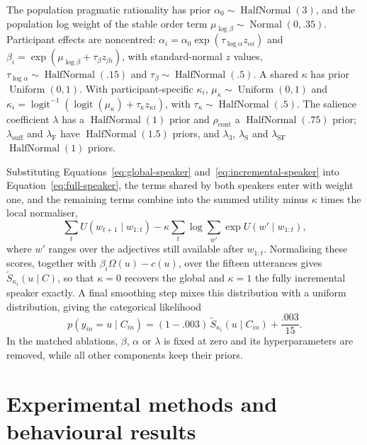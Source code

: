 \documentclass[10pt,a4paper,fleqn]{article}
\begin{document}
The population pragmatic rationality has prior $\alpha_0\sim\operatorname{HalfNormal}(3)$, and the population log weight of the stable order term $\mu_{\log\beta}\sim\operatorname{Normal}(0,.35)$.
Participant effects are noncentred: $\alpha_i=\alpha_0\exp(\tau_{\log\alpha}z_{\alpha i})$ and $\beta_i=\exp(\mu_{\log\beta}+\tau_\beta z_{\beta i})$, with standard-normal $z$ values, $\tau_{\log\alpha}\sim\operatorname{HalfNormal}(.15)$ and $\tau_\beta\sim\operatorname{HalfNormal}(.5)$.
A shared $\kappa$ has prior $\operatorname{Uniform}(0,1)$.
With participant-specific $\kappa_i$, $\mu_\kappa\sim\operatorname{Uniform}(0,1)$ and $\kappa_i=\operatorname{logit}^{-1}(\operatorname{logit}(\mu_\kappa)+\tau_\kappa z_{\kappa i})$, with $\tau_\kappa\sim\operatorname{HalfNormal}(.5)$.
The salience coefficient $\lambda$ has a $\operatorname{HalfNormal}(1)$ prior and $\rho_{\mathrm{cont}}$ a $\operatorname{HalfNormal}(.75)$ prior; $\lambda_{\mathrm{suff}}$ and $\lambda_{\mathrm F}$ have $\operatorname{HalfNormal}(1.5)$ priors, and $\lambda_3$, $\lambda_{\mathrm S}$ and $\lambda_{\mathrm{SF}}$ $\operatorname{HalfNormal}(1)$ priors.

Substituting Equations~\ref{eq:global-speaker} and~\ref{eq:incremental-speaker} into Equation~\ref{eq:full-speaker}, the terms shared by both speakers enter with weight one, and the remaining terms combine into the summed utility minus $\kappa$ times the local normaliser,
\begin{equation}
  \sum_{t}U(w_{t+1}\mid w_{1:t})
   -\kappa\sum_{t}\log\!\sum_{w'}\exp U(w'\mid w_{1:t}),
\label{eq:local-normalisation}
\end{equation}
where $w'$ ranges over the adjectives still available after $w_{1:t}$.
Normalising these scores, together with $\beta_i\Omega(u)-c(u)$, over the fifteen utterances gives $\widetilde S_{\kappa_i}(u\mid C)$, so that $\kappa=0$ recovers the global and $\kappa=1$ the fully incremental speaker exactly.
A final smoothing step mixes this distribution with a uniform distribution, giving the categorical likelihood
\begin{equation}
 p(y_{in}=u\mid C_{in})=(1-.003)\,\widetilde S_{\kappa_i}(u\mid C_{in})+\frac{.003}{15}.
\end{equation}
In the matched ablations, $\beta$, $\alpha$ or $\lambda$ is fixed at zero and its hyperparameters are removed, while all other components keep their priors.

\section{Experimental methods and behavioural results}
\label{app:experiments}
\end{document}
